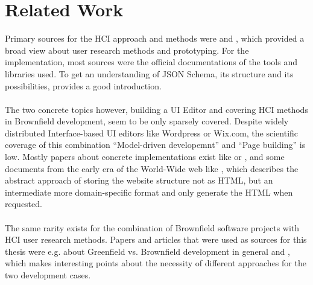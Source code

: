\section{Related Work}

Primary sources for the HCI approach and methods were \cite{LearnHCI:2020ys} and \cite{Interactiondesign:2019ys}, which provided a broad view about user research methods and prototyping.
For the implementation, most sources were the official documentations of the tools and libraries used. To get an understanding of JSON Schema, its structure and its possibilities, \cite{JsonSchema:2022ys} provides a good introduction.
\\\\
The two concrete topics however, building a UI Editor and covering HCI methods in Brownfield development, seem to be only sparsely covered.
Despite widely distributed Interface-based UI editors like Wordpress or Wix.com, the scientific coverage of this combination ``Model-driven developemnt'' and ``Page building'' is low.
Mostly papers about concrete implementations exist like \cite{ServFaceBuilder:2009ys} or \cite{Harageones:2022}, and some documents from the early era of the World-Wide web like \cite{AutoWeb:2000ys}, which describes the abstract approach of storing the website
structure not as HTML, but an intermediate more domain-specific format and only generate the HTML when requested.
\\\\
The same rarity exists for the combination of Brownfield software projects with HCI user research methods.
Papers and articles that were used as sources for this thesis were e.g. \cite{JohnAdamsIt:Greenfield} about Greenfield vs. Brownfield development in general and \cite{BrownfieldToGreenfield:2021ys}, which makes interesting points about the necessity
of different approaches for the two development cases.